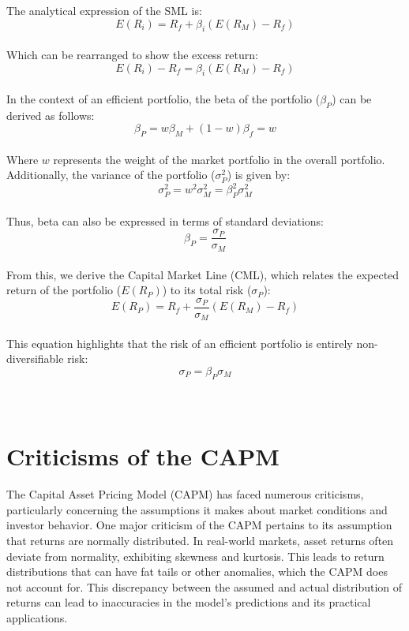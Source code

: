 \documentclass[a4paper,10pt]{article}
\begin{document}
\noindent The analytical expression of the SML is: \\
\[ E(R_i) = R_f + \beta_i (E(R_M) - R_f) \] \\
\noindent Which can be rearranged to show the excess return: \\
\[ E(R_i) - R_f = \beta_i (E(R_M) - R_f) \] \\

\noindent In the context of an efficient portfolio, the beta of the portfolio (\( \beta_P \)) can be derived as follows: \\
\[ \beta_P = w \beta_M + (1 - w) \beta_f = w \] \\
\noindent Where \( w \) represents the weight of the market portfolio in the overall portfolio. Additionally, the variance of the portfolio (\( \sigma_P^2 \)) is given by: \\
\[ \sigma_P^2 = w^2 \sigma_M^2 = \beta_P^2 \sigma_M^2 \] \\
\noindent Thus, beta can also be expressed in terms of standard deviations: \\
\[ \beta_P = \frac{\sigma_P}{\sigma_M} \] \\

\noindent From this, we derive the Capital Market Line (CML), which relates the expected return of the portfolio (\( E(R_P) \)) to its total risk (\( \sigma_P \)): \\
\[ E(R_P) = R_f + \frac{\sigma_P}{\sigma_M} (E(R_M) - R_f) \] \\
\noindent This equation highlights that the risk of an efficient portfolio is entirely non-diversifiable risk: \\
\[ \sigma_P = \beta_P \sigma_M \] \\
\

\section{Criticisms of the CAPM}

\noindent The Capital Asset Pricing Model (CAPM) has faced numerous criticisms, particularly concerning the assumptions it makes about market conditions and investor behavior. One major criticism of the CAPM pertains to its assumption that returns are normally distributed. In real-world markets, asset returns often deviate from normality, exhibiting skewness and kurtosis. This leads to return distributions that can have fat tails or other anomalies, which the CAPM does not account for. This discrepancy between the assumed and actual distribution of returns can lead to inaccuracies in the model's predictions and its practical applications. \\
\end{document}

